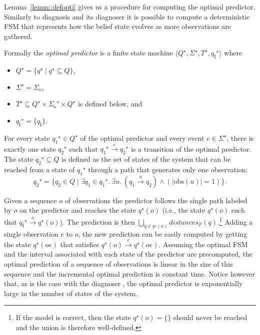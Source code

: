 \documentclass{article}
\newcommand{\qi}[0]{q_{\mathrm{I}}}
\newcommand{\sigmao}[0]{\Sigma_{\mathrm{o}}}
\newcommand{\Sigmao}[0]{\sigmao}
\newcommand{\trans}[1]{\stackrel{#1}{\rightarrow}}
\newcommand{\obs}[0]{\mathrm{obs}}
\newcommand{\distances}{\mathit{distances}_F}
\newcommand{\optimal}[1]{{#1}^\star}
\newcommand{\set}[1]{\{#1\}}
\begin{document}
Lemma~\ref{lemm::defopti} gives us a procedure 
for computing the optimal predictor.  
Similarly to diagnosis and its diagnoser \cite{sampath-etal::tac::95} 
it is possible to compute a deterministic FSM 
that represents how the belief state evolves 
as more observations are gathered.  

Formally the \emph{optimal predictor} is a finite state machine 
$\langle \optimal{Q}, \optimal{\Sigma}, \optimal{T}, \optimal{\qi}\rangle$ 
where 
\begin{itemize}
\item 
  $\optimal{Q} = \set{\optimal{q} \mid \optimal{q} \subseteq Q}$, 
\item 
  $\optimal{\Sigma} = \Sigmao$, 
\item 
  $\optimal{T} \subseteq 
  \optimal{Q} \times \optimal{\Sigmao} \times \optimal{Q}$ 
  is defined below, 
  and 
\item 
  $\optimal{\qi} = \set{\qi}$. 
\end{itemize}

For every state $\optimal{q_1} \in \optimal{Q}$ of the optimal predictor
and every event $e \in \optimal{\Sigma}$, 
there is exactly one state $\optimal{q_2}$ 
such that $\optimal{q_1} \trans{e} \optimal{q_2}$ 
is a transition of the optimal predictor.  
The state $\optimal{q_2} \subseteq Q$ is defined 
as the set of states of the system 
that can be reached from a state of $\optimal{q_1}$ 
through a path that generates only one observation: 
\begin{displaymath}
  \optimal{q_2} = 
  \set{ q_2 \in Q \mid \exists q_1 \in \optimal{q_1}.\ 
    \exists u.\ (q_1 \trans{u} q_2) \land (|\obs(u)| = 1)
  }.
\end{displaymath}

Given a sequence $o$ of observations 
the predictor follows the single path labeled by $o$ 
on the predictor and reaches the state $\optimal{q}(o)$ 
(i.e., the state $\optimal{q}(o)$ 
such that $\optimal{\qi} \trans{o} \optimal{q}(o)$).  
The prediction is then $\bigcup_{q \in \optimal{q}(o)} \distances(q)$.\footnote{If the model is correct, 
then the state $\optimal{q}(o) = \set{}$ should never be reached 
and the union is therefore well-defined.}
Adding a single observation $e$ to $o$, 
the new prediction can be easily computed 
by getting the state $\optimal{q}(oe)$ that satisfies 
$\optimal{q}(o) \trans{e} \optimal{q}(oe)$.  
Assuming the optimal FSM 
and the interval associated with each state of the predictor 
are precomputed, 
the optimal prediction of a sequence of observations 
is linear in the size of this sequence 
and the incremental optimal prediction is constant time.  
Notice however that, as is the case with the diagnoser 
\cite{rintanen::ijcai::07}, 
the optimal predictor is exponentially large 
in the number of states of the system.  
\end{document}
